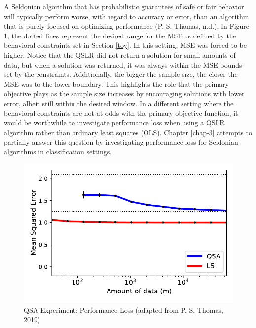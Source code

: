 \documentclass[12pt, twoside]{amherstthesis}
\begin{document}
A Seldonian algorithm that has probabilistic guarantees of safe or fair behavior will typically perform worse, with regard to accuracy or error, than an algorithm that is purely focused on optimizing performance (P. S. Thomas, n.d.). In Figure \ref{fig:fig4}, the dotted lines represent the desired range for the MSE as defined by the behavioral constraints set in Section \ref{toy}. In this setting, MSE was forced to be higher. Notice that the QSLR did not return a solution for small amounts of data, but when a solution was returned, it was always within the MSE bounds set by the constraints. Additionally, the bigger the sample size, the closer the MSE was to the lower boundary. This highlights the role that the primary objective plays as the sample size increases by encouraging solutions with lower error, albeit still within the desired window. In a different setting where the behavioral constraints are not at odds with the primary objective function, it would be worthwhile to investigate performance loss when using a QSLR algorithm rather than ordinary least squares (OLS). Chapter \ref{chap-3} attempts to partially answer this question by investigating performance loss for Seldonian algorithms in classification settings.
\begin{figure}

{\centering \includegraphics{Dasha-Asienga_StatThesis_files/figure-latex/fig4-1} 

}

\caption{QSA Experiment: Performance Loss (adapted from P. S. Thomas, 2019)}\label{fig:fig4}
\end{figure}
\end{document}
